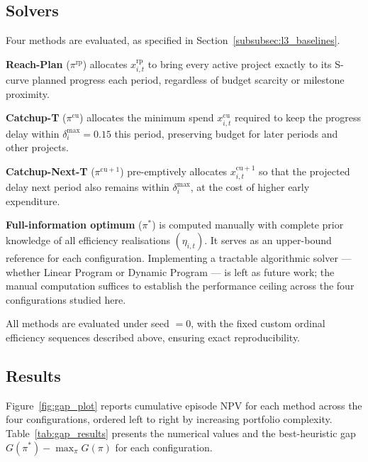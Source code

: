 \subsection{Solvers}
\label{subsec:solvers}

Four methods are evaluated, as specified in
Section~\ref{subsubsec:l3_baselines}.

\textbf{Reach-Plan} ($\pi^{\mathrm{rp}}$) allocates
$x^{\mathrm{rp}}_{i,t}$ to bring every active project exactly to its
S-curve planned progress each period, regardless of budget scarcity or
milestone proximity.

\textbf{Catchup-T} ($\pi^{\mathrm{cu}}$) allocates the minimum spend
$x^{\mathrm{cu}}_{i,t}$ required to keep the progress delay within
$\delta^{\max}_i = 0.15$ this period, preserving budget for later
periods and other projects.

\textbf{Catchup-Next-T} ($\pi^{\mathrm{cu}+1}$) pre-emptively allocates
$x^{\mathrm{cu}+1}_{i,t}$ so that the projected delay next period also
remains within $\delta^{\max}_i$, at the cost of higher early
expenditure.

\textbf{Full-information optimum} ($\pi^{*}$) is computed manually with
complete prior knowledge of all efficiency realisations $(\eta_{i,t})$.
It serves as an upper-bound reference for each configuration.
Implementing a tractable algorithmic solver --- whether Linear Program
or Dynamic Program --- is left as future work; the manual computation
suffices to establish the performance ceiling across the four
configurations studied here.

All methods are evaluated under seed $= 0$, with the fixed custom
ordinal efficiency sequences described above, ensuring exact
reproducibility.

\subsection{Results}
\label{subsec:results}

Figure~\ref{fig:gap_plot} reports cumulative episode NPV for each
method across the four configurations, ordered left to right by
increasing portfolio complexity. Table~\ref{tab:gap_results} presents
the numerical values and the best-heuristic gap
$G(\pi^{*}) - \max_\pi G(\pi)$ for each configuration.


